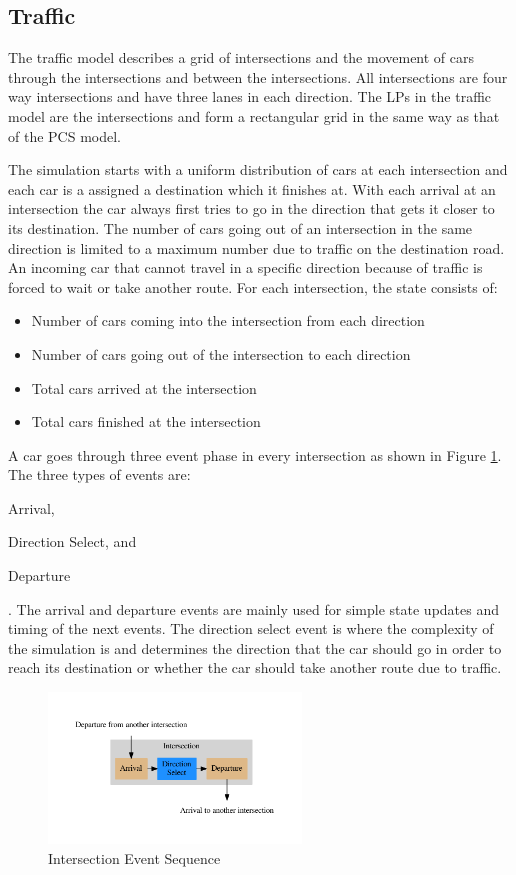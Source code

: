 \documentclass[11pt]{book}
\begin{document}
\subsection{Traffic}

The traffic model describes a grid of intersections and the movement of cars through
the intersections and between the intersections.  All intersections are four way intersections
and have three lanes in each direction.  The LPs in the traffic model are the intersections
and form a rectangular grid in the same way as that of the PCS model.

The simulation starts with a uniform distribution of cars at each intersection and each
car is a assigned a destination which it finishes at.  With each arrival at an intersection
the car always first tries to go in the direction that gets it closer to its destination.
The number of cars going out of an intersection in the same direction is limited to a
maximum number due to traffic on the destination road.  An incoming car that cannot travel in
a specific direction because of traffic is forced to wait or take another route.  For each
intersection, the state consists of:

\begin{itemize}
    \item Number of cars coming into the intersection from each direction
    \item Number of cars going out of the intersection to each direction
    \item Total cars arrived at the intersection
    \item Total cars finished at the intersection
\end{itemize}

A car goes through three event phase in every intersection as shown in Figure
\ref{traffic_events}.  The three types of events are: \begin{inparaenum}[(1)] \item Arrival,
\item Direction Select, and \item Departure \end{inparaenum}.  The arrival and departure
events are mainly used for simple state updates and timing of the next events.
The direction select event is where the complexity of the simulation is and determines the
direction that the car should go in order to reach its destination or whether the car should
take another route due to traffic.

\begin{figure}
    \centering
    \includegraphics[width=0.6\textwidth,quiet]{figs/graphviz/traffic_events.pdf}
    \caption{Intersection Event Sequence}\label{traffic_events}
\end{figure}
\end{document}
